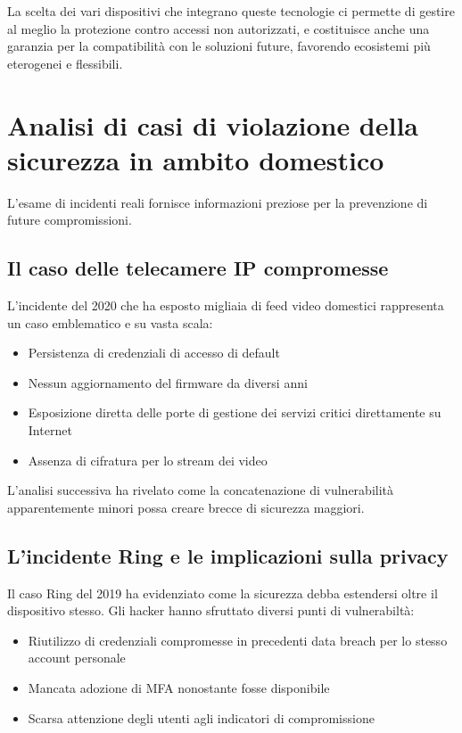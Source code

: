 La scelta dei vari dispositivi che integrano queste tecnologie ci permette di gestire al meglio la protezione contro accessi non autorizzati, e costituisce anche una garanzia per la compatibilità con le soluzioni future, favorendo ecosistemi più eterogenei e flessibili.

\section{Analisi di casi di violazione della sicurezza in ambito domestico}

L'esame di incidenti reali fornisce informazioni preziose per la prevenzione di future compromissioni.

\subsection{Il caso delle telecamere IP compromesse}

L'incidente del 2020 che ha esposto migliaia di feed video domestici rappresenta un caso emblematico e su vasta scala:

\begin{itemize}
    \item Persistenza di credenziali di accesso di default 
    \item Nessun aggiornamento del firmware da diversi anni
    \item Esposizione diretta delle porte di gestione dei servizi critici direttamente su Internet
    \item Assenza di cifratura per lo stream dei video
\end{itemize}

L'analisi successiva ha rivelato come la concatenazione di vulnerabilità apparentemente minori possa creare brecce di sicurezza maggiori.

\subsection{L'incidente Ring e le implicazioni sulla privacy}

Il caso Ring del 2019 ha evidenziato come la sicurezza debba estendersi oltre il dispositivo stesso. Gli hacker hanno sfruttato diversi punti di vulnerabiltà:

\begin{itemize}
    \item Riutilizzo di credenziali compromesse in precedenti data breach per lo stesso account personale
    \item Mancata adozione di MFA nonostante fosse disponibile
    \item Scarsa attenzione degli utenti agli indicatori di compromissione
\end{itemize}

